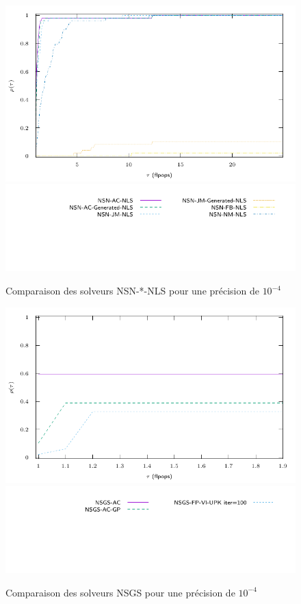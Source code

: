 \documentclass{CSMA2017}
\begin{document}
\begin{figure}
  \centering
  \includegraphics{figure/LowWall_FEM.1e-4/nsn_nls/profile-LMGC_LowWall_FEM.pdf}
  \includegraphics{figure/LowWall_FEM.1e-4/nsn_nls/profile-LMGC_LowWall_FEM_legend.pdf}
  \caption{Comparaison des solveurs NSN-*-NLS pour une précision de $10^{-4}$}
  \label{fig:LowWall_FEM.1e-4.nsn_nls}
\end{figure}
\begin{figure}
  \centering
  \includegraphics{figure/LowWall_FEM.1e-4/nsgs/profile-LMGC_LowWall_FEM.pdf}
  \includegraphics{figure/LowWall_FEM.1e-4/nsgs/profile-LMGC_LowWall_FEM_legend.pdf}
  \caption{Comparaison des solveurs NSGS pour une précision de $10^{-4}$}
  \label{fig:LowWall_FEM.1e-4.nsgs}
\end{figure}
\end{document}
